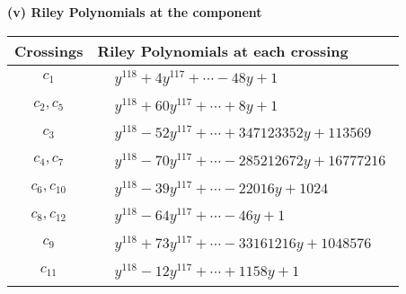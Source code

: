 \documentclass[1p]{elsarticle_modified}
\theoremstyle{definition}
\begin{document}
\newpage\renewcommand{\arraystretch}{1}
\flushleft \textbf{(v) Riley Polynomials at the component}\newline \\
\begin{tabular}{m{50pt}|m{274pt}}
Crossings & \hspace{64pt}Riley Polynomials at each crossing \\
\hline $$\begin{aligned}c_{1}\end{aligned}$$&$\begin{aligned}
&y^{118}+4 y^{117}+\cdots-48 y+1
\end{aligned}$\\
\hline $$\begin{aligned}c_{2},c_{5}\end{aligned}$$&$\begin{aligned}
&y^{118}+60 y^{117}+\cdots+8 y+1
\end{aligned}$\\
\hline $$\begin{aligned}c_{3}\end{aligned}$$&$\begin{aligned}
&y^{118}-52 y^{117}+\cdots+347123352 y+113569
\end{aligned}$\\
\hline $$\begin{aligned}c_{4},c_{7}\end{aligned}$$&$\begin{aligned}
&y^{118}-70 y^{117}+\cdots-285212672 y+16777216
\end{aligned}$\\
\hline $$\begin{aligned}c_{6},c_{10}\end{aligned}$$&$\begin{aligned}
&y^{118}-39 y^{117}+\cdots-22016 y+1024
\end{aligned}$\\
\hline $$\begin{aligned}c_{8},c_{12}\end{aligned}$$&$\begin{aligned}
&y^{118}-64 y^{117}+\cdots-46 y+1
\end{aligned}$\\
\hline $$\begin{aligned}c_{9}\end{aligned}$$&$\begin{aligned}
&y^{118}+73 y^{117}+\cdots-33161216 y+1048576
\end{aligned}$\\
\hline $$\begin{aligned}c_{11}\end{aligned}$$&$\begin{aligned}
&y^{118}-12 y^{117}+\cdots+1158 y+1
\end{aligned}$\\
\hline
\end{tabular}\\~\\
\end{document}
